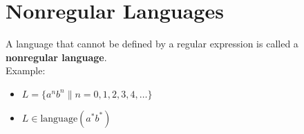 \section{Nonregular Languages}
A language that cannot be defined by a regular expression is called a \textbf{nonregular language}.
\\
Example:
\begin{itemize}
    \item $L = \{a^nb^n \| n=0,1,2,3,4,\ldots\}$
    \item $L \in \text{language}\left(a^*b^*\right)$
    
\end{itemize}
